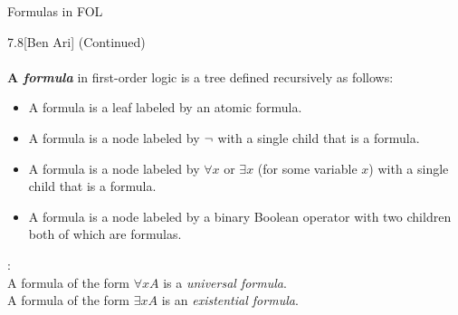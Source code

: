 \documentclass[style=sailor,size=12pt]{powerdot}
\begin{document}
\begin{wideslide}[bm=,toc=]{Formulas in FOL}
\begin{defn}{7.8}[Ben Ari] (Continued)\\~\\
\textbf{ A \emph{formula}} in first-order logic is
a tree defined recursively as follows:
\end{defn}
\vspace{-3ex}
\begin{itemize}
\item<2-> A formula is a leaf labeled by an atomic formula.
\item<3-> A formula is a node labeled by $\mathop{\neg}$ with a single child that is a
formula.
\item<4-> A formula is a node labeled by $\forall x$ or $\exists x$ (for some
 variable $x$) with a single child that is a formula.
\item<5-> A formula is a node labeled by a binary Boolean operator with two
children both of which are formulas.
\end{itemize}
:\\
A formula of the form $\forall x A$ is a \emph{universal formula}.\\
A formula of the form $\exists x A$ is an \emph{existential formula}.\\
\end{wideslide}
\end{document}
